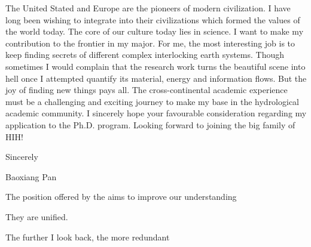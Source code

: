 \documentclass{article}
\begin{document}
{The United Stated and Europe are the pioneers of modern civilization. I have long been wishing to integrate into their civilizations which formed the values of the world today. The core of our culture today lies in science. I want to make my contribution to the frontier in my major. For me, the most interesting job is to keep finding secrets of different complex interlocking earth systems. Though sometimes I would complain that the research work turns the beautiful scene into hell once I attempted quantify its material, energy and information flows. But the joy of finding new things pays all. The cross-continental academic experience must be a challenging and  exciting journey to make my base in the hydrological academic community. I sincerely hope your favourable consideration regarding my application to the Ph.D. program. Looking forward to joining the big family of HIH!
\begin{flushright}
Sincerely 

Baoxiang Pan
\end{flushright}
 




 

















  
\iffalse

The position offered by the  aims to improve our understanding  


They are unified. 

The further I look back, the more redundant 






}
\end{document}
